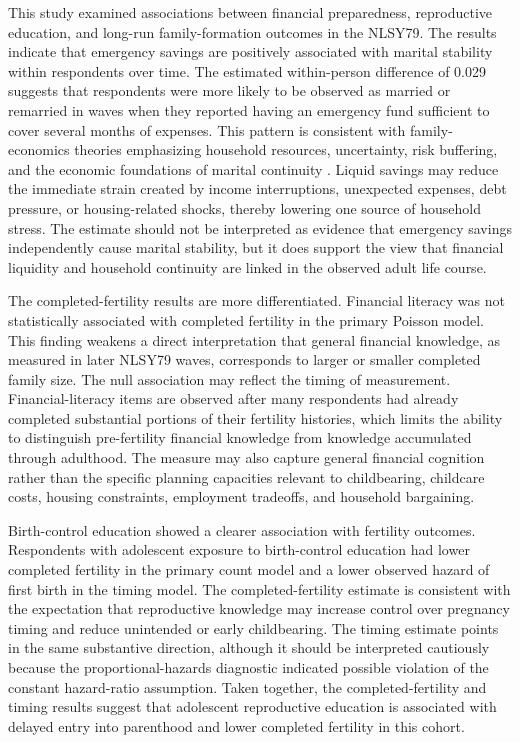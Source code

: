 \documentclass[12pt]{article}
\begin{document}
This study examined associations between financial preparedness, reproductive education, and long-run family-formation outcomes in the NLSY79. The results indicate that emergency savings are positively associated with marital stability within respondents over time. The estimated within-person difference of 0.029 suggests that respondents were more likely to be observed as married or remarried in waves when they reported having an emergency fund sufficient to cover several months of expenses. This pattern is consistent with family-economics theories emphasizing household resources, uncertainty, risk buffering, and the economic foundations of marital continuity \citep{becker1981,dew2012}. Liquid savings may reduce the immediate strain created by income interruptions, unexpected expenses, debt pressure, or housing-related shocks, thereby lowering one source of household stress. The estimate should not be interpreted as evidence that emergency savings independently cause marital stability, but it does support the view that financial liquidity and household continuity are linked in the observed adult life course.

The completed-fertility results are more differentiated. Financial literacy was not statistically associated with completed fertility in the primary Poisson model. This finding weakens a direct interpretation that general financial knowledge, as measured in later NLSY79 waves, corresponds to larger or smaller completed family size. The null association may reflect the timing of measurement. Financial-literacy items are observed after many respondents had already completed substantial portions of their fertility histories, which limits the ability to distinguish pre-fertility financial knowledge from knowledge accumulated through adulthood. The measure may also capture general financial cognition rather than the specific planning capacities relevant to childbearing, childcare costs, housing constraints, employment tradeoffs, and household bargaining.

Birth-control education showed a clearer association with fertility outcomes. Respondents with adolescent exposure to birth-control education had lower completed fertility in the primary count model and a lower observed hazard of first birth in the timing model. The completed-fertility estimate is consistent with the expectation that reproductive knowledge may increase control over pregnancy timing and reduce unintended or early childbearing. The timing estimate points in the same substantive direction, although it should be interpreted cautiously because the proportional-hazards diagnostic indicated possible violation of the constant hazard-ratio assumption. Taken together, the completed-fertility and timing results suggest that adolescent reproductive education is associated with delayed entry into parenthood and lower completed fertility in this cohort.
\end{document}
